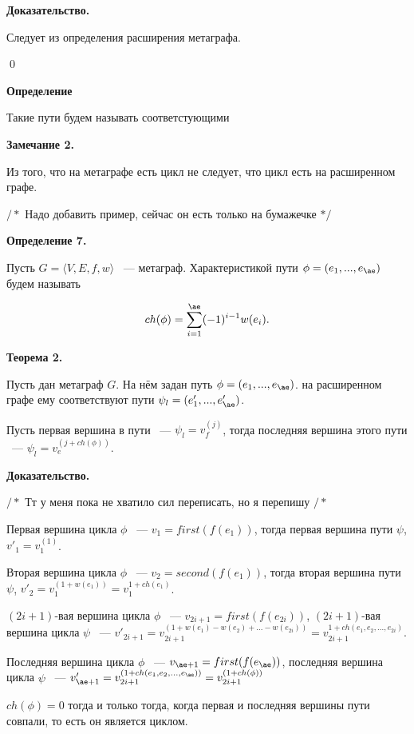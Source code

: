 \documentclass[14pt]{mmcs-article}
\begin{document}
\textbf{Доказательство.}

Следует из определения расширения метаграфа.

\qed

\textbf{Определение}

Такие пути будем называть соответстующими

\textbf{Замечание 2.}

Из того, что на метаграфе есть цикл не следует, что цикл есть на расширенном графе.

$/*$ Надо добавить пример, сейчас он есть только на бумажечке $*/$

\pagebreak

\textbf{Определение 7.}

Пусть $G = \langle V, E, f, w \rangle$ ~--- метаграф. Характеристикой пути $\phi = (e_1, ..., e_{\ae})$ будем называть

\[
    ch(\phi) = \sum_{i = 1}^{\ae}(-1)^{i - 1}w(e_i).
\]

\textbf{Теорема 2.}

Пусть дан метаграф $G$. На нём задан путь $\phi = (e_1, ..., e_{\ae})$. на расширенном графе ему соответствуют пути $\psi_l = (e'_1, ..., e'_{\ae})$.

Пусть первая вершина в пути ~--- $\psi_l = v_f^{(j)}$, тогда последняя вершина этого пути ~--- $\psi_l = v_e^{(j + ch(\phi))}$.

\textbf{Доказательство.}

$/*$ Тт у меня пока не хватило сил переписать, но я перепишу $/*$

Первая вершина цикла $\phi$ ~--- $v_1 = first(f(e_1))$, тогда первая вершина пути $\psi$, $v'_1 = v_1^{(1)}$.

Вторая вершина цикла $\phi$ ~--- $v_2 = second(f(e_1))$, тогда вторая вершина пути $\psi$, $v'_2 = v_1^{(1 + w(e_1))} = v_1^{1 + ch(e_1)}$.

$(2i + 1)$-вая вершина цикла $\phi$ ~--- $v_{2i + 1} = first(f(e_{2i}))$, $(2i + 1)$-вая вершина цикла $\psi$ ~--- $v'_{2i + 1} = v_{2i + 1}^{(1 + w(e_1) - w(e_2) + ... - w(e_{2i}))} =  v_{2i + 1}^{1 + ch(e_1, e_2, ..., e_{2i})}$.

Последняя вершина цикла $\phi$ ~--- $v_{\ae + 1} = first(f(e_{\ae}))$, последняя вершина цикла $\psi$ ~--- $v'_{\ae + 1} = v_{2i + 1}^{(1 + ch(e_1, e_2, ..., e_{\ae}))} = v_{2i + 1}^{(1 + ch(\phi))}$

$ch(\phi) = 0$ тогда и только тогда, когда первая и последняя вершины пути совпали, то есть он является циклом.
\end{document}
